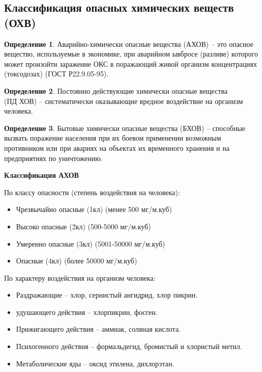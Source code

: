 \documentclass[a4paper, 12pt]{article}
\theoremstyle{definition}
\newtheorem*{definition}{Определение}
\begin{document}
        \subsection{Классификация опасных химических веществ (ОХВ)}
        \begin{definition}
            Аварийно-химически опасные вещества (АХОВ) -- это опасное вещество, используемые в экономике, при аварийном ывбросе (разливе) которого может произойти заражение ОКС в поражающий живой организм концентрациях (токсодозах) (ГОСТ Р22.9.05-95).
        \end{definition}
        \begin{definition}
            Постоянно действующие химически опасные вещества\\ (ПД ХОВ) -- систематически оказывающие вредное воздействие на организм человека.
        \end{definition}
        \begin{definition}
            Бытовые химически опасные вещества (БХОВ) -- способные вызвать поражение населения при их боевом применении возможным противником или при авариях на объектах их временного хранения и на предприятиях по уничтожению.
        \end{definition}
        \begin{center}
            \textbf{Классификация АХОВ} 
        \end{center}
        По классу опасности (степень воздействия на человека):
        \begin{itemize}
            \item Чрезвычайно опасные (1кл) (менее 500 мг/м.куб)
            \item Высоко опасные (2кл) (500-5000 мг/м.куб)
            \item Умеренно опасные (3кл) (5001-50000 мг/м.куб)
            \item Опасные (4кл) (более 50000 мг/м.куб)
        \end{itemize}
        По характеру воздействия на организм человека:
        \begin{itemize}
            \item Раздражающие -- хлор, сернистый ангидрид, хлор пикрин.
            \item удушающего действия -- хлорпикрин, фосген.
            \item Прижигающего действия -- аммиак, соляная кислота.
            \item Психогенного действия -- формальдегид, бромистый и хлористый метил.
            \item Метаболические яды -- оксид этилена, дихлорэтан.
        \end{itemize}
\end{document}
